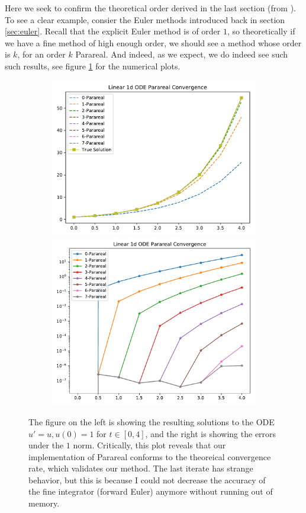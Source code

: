 Here we seek to confirm the theoretical order derived in the last section (from
\cite{balarticle} \cite{fieldstalk}). To see a clear example, consier the Euler
methods introduced back in section \ref{sec:euler}. Recall that the explicit
Euler method is of order $1$, so theoretically if we have a fine method of high
enough order, we should see a method whose order is $k$, for an order $k$
Parareal. And indeed, as we expect, we do indeed see such such results, see
figure \ref{fig:conv_fw} for the numerical plots.

\begin{figure}[!htb]
  \centering
  \begin{subfigure}{\textwidth}
    \centering
    \includegraphics[width=.515\textwidth]
      {./resources/converge_fwsols}
    \includegraphics[width=.475\textwidth]
      {./resources/converge_fwerrs}
  \end{subfigure}%
  \caption{The figure on the left is showing the resulting solutions to the ODE
    $u' = u, u(0) = 1$ for $t \in [0, 4]$, and the right is showing the errors
    under the $1$ norm. Critically, this plot reveals that our implementation of
    Parareal conforms to the theoreical convergence rate, which validates our
    method. The last iterate has strange behavior, but this is because I could
    not decrease the accuracy of the fine integrator (forward Euler) anymore
    without running out of memory.}\label{fig:conv_fw}
\end{figure}

